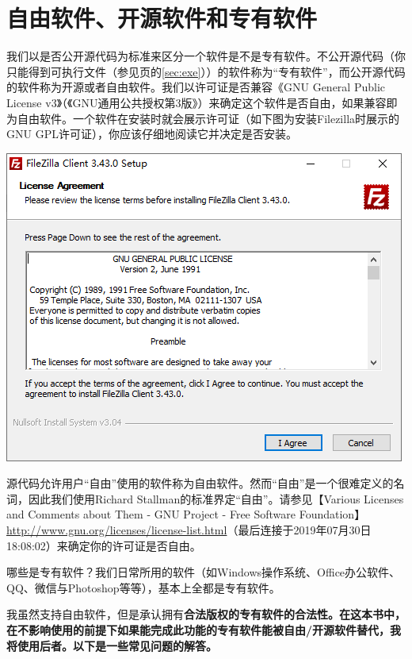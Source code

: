 \section{自由软件、开源软件和专有软件}
我们以是否公开源代码为标准来区分一个软件是不是专有软件。不公开源代码（你只能得到可执行文件（参见\pageref{sec:exe}页的\ref{sec:exe}））的软件称为“专有软件”，而公开源代码的软件称为开源或者自由软件。我们以许可证是否兼容《GNU General Public License v3》（《GNU通用公共授权第3版》）来确定这个软件是否自由，如果兼容即为自由软件。一个软件在安装时就会展示许可证（如下图为安装Filezilla时展示的GNU GPL许可证），你应该仔细地阅读它并决定是否安装。
\begin{center}
	\includegraphics[scale=0.6]{pic/fzi}
\end{center}\par
源代码允许用户“自由”使用的软件称为自由软件。然而“自由”是一个很难定义的名词，因此我们使用Richard Stallman的标准界定“自由”。请参见【Various Licenses and Comments about Them - GNU Project - Free Software Foundation】\url{http://www.gnu.org/licenses/license-list.html}（最后连接于2019年07月30日18:08:02）来确定你的许可证是否自由。\par
哪些是专有软件？我们日常所用的软件（如Windows操作系统、Office办公软件、QQ、微信与Photoshop等等），基本上全都是专有软件。\par
我虽然支持自由软件，但是承认拥有\bf 合法版权\normalall 的专有软件的合法性。在这本书中，在\bf 不影响使用\normalall 的前提下如果能完成此功能的专有软件能被自由/开源软件替代，我将使用后者。以下是一些常见问题的解答。
